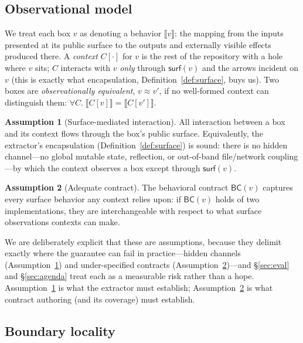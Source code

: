 \documentclass[sigconf,review,anonymous]{acmart}
\theoremstyle{plain}
\theoremstyle{definition}
\newtheorem{assumption}{Assumption}
\begin{document}
\subsection{Observational model}

We treat each box $v$ as denoting a behavior $\llbracket v \rrbracket$: the
mapping from the inputs presented at its public surface to the outputs and
externally visible effects produced there. A \emph{context} $C[\cdot]$ for $v$
is the rest of the repository with a hole where $v$ sits; $C$ interacts with
$v$ \emph{only} through $\mathsf{surf}(v)$ and the arrows incident on $v$
(this is exactly what encapsulation, Definition~\ref{def:surface}, buys us).
Two boxes are \emph{observationally equivalent}, $v \approx v'$, if no
well-formed context can distinguish them:
$\forall C.\; \llbracket C[v] \rrbracket = \llbracket C[v'] \rrbracket$.

\begin{assumption}[Surface-mediated interaction]\label{asm:surface}
All interaction between a box and its context flows through the box's public
surface. Equivalently, the extractor's encapsulation (Definition~\ref{def:surface})
is sound: there is no hidden channel---no global mutable state, reflection, or
out-of-band file/network coupling---by which the context observes a box except
through $\mathsf{surf}(v)$.
\end{assumption}

\begin{assumption}[Adequate contract]\label{asm:adequate}
The behavioral contract $\mathsf{BC}(v)$ captures every surface behavior any
context relies upon: if $\mathsf{BC}(v)$ holds of two implementations, they are
interchangeable with respect to what surface observations contexts can make.
\end{assumption}

\noindent
We are deliberately explicit that these are assumptions, because they delimit
exactly where the guarantee can fail in practice---hidden channels
(Assumption~\ref{asm:surface}) and under-specified contracts
(Assumption~\ref{asm:adequate})---and \S\ref{sec:eval} and \S\ref{sec:agenda}
treat each as a measurable risk rather than a hope. Assumption~\ref{asm:surface}
is what the extractor must establish; Assumption~\ref{asm:adequate} is what
contract authoring (and its coverage) must establish.

\subsection{Boundary locality}
\end{document}

